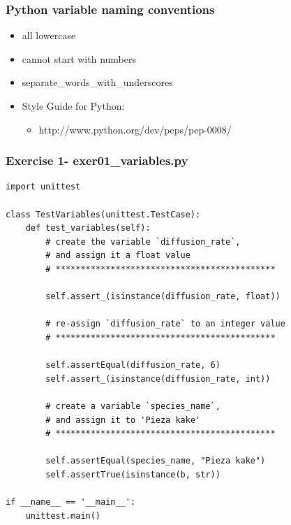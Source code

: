 \documentclass{beamer}
\newcommand\Fontix{\fontsize{9}{8.3}\selectfont}
\begin{document}
\begin{frame}[fragile]
\frametitle{Python variable naming conventions}
\begin{itemize}
\item all lowercase
\item cannot start with numbers
\item separate\_words\_with\_underscores
\item Style Guide for Python: 
\begin{itemize}
\item http://www.python.org/dev/peps/pep-0008/
\end{itemize}
\end{itemize}
\end{frame}

\begin{frame}[fragile]
\frametitle{Exercise 1- exer01\_variables.py}
\Fontix
\begin{lstlisting}
import unittest

class TestVariables(unittest.TestCase):
    def test_variables(self):
        # create the variable `diffusion_rate`, 
        # and assign it a float value
        # ********************************************

        self.assert_(isinstance(diffusion_rate, float))

        # re-assign `diffusion_rate` to an integer value
        # ********************************************
        
        self.assertEqual(diffusion_rate, 6)
        self.assert_(isinstance(diffusion_rate, int))

        # create a variable `species_name`,
        # and assign it to 'Pieza kake'
        # ********************************************

        self.assertEqual(species_name, "Pieza kake")
        self.assertTrue(isinstance(b, str))
        
if __name__ == '__main__':
    unittest.main()
\end{lstlisting}
\end{frame}



\end{document}
